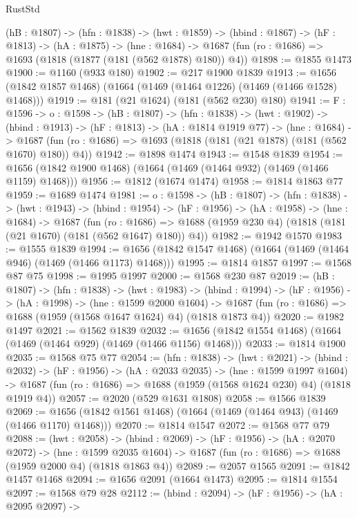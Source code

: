 \begin{lexlean}{RustStd}
\begin{coremodule}
{\begin{coremodule}
{{{  (hB : @1807) ->
  (hfn : @1838) ->
  (hwt : @1859) ->
  (hbind : @1867) ->
  (hF : @1813) ->
  (hA : @1875) ->
  (hne : @1684) -> @1687 (fun (ro : @1686) => @1693 (@1818 (@1877 (@181 (@562 @1878) @180)) @4))
@1898 := @1855 @1473
@1900 := @1160 (@933 @180)
@1902 := @217 @1900 @1839
@1913 := @1656 (@1842 @1857 @1468) (@1664 (@1469 (@1464 @1226) (@1469 (@1466 @1528) @1468)))
@1919 := @181 (@21 @1624) (@181 (@562 @230) @180)
@1941 := {F : @1596} ->
  {o : @1598} ->
  (hB : @1807) ->
  (hfn : @1838) ->
  (hwt : @1902) ->
  (hbind : @1913) ->
  (hF : @1813) ->
  (hA : @1814 @1919 @77) ->
  (hne : @1684) ->
  @1687 (fun (ro : @1686) => @1693 (@1818 (@181 (@21 @1878) (@181 (@562 @1670) @180)) @4))
@1942 := @1898 @1474
@1943 := @1548 @1839
@1954 := @1656 (@1842 @1900 @1468) (@1664 (@1469 (@1464 @932) (@1469 (@1466 @1159) @1468)))
@1956 := @1812 (@1674 @1474)
@1958 := @1814 @1863 @77
@1959 := @1689 @1474
@1981 := {o : @1598} ->
  (hB : @1807) ->
  (hfn : @1838) ->
  (hwt : @1943) ->
  (hbind : @1954) ->
  (hF : @1956) ->
  (hA : @1958) ->
  (hne : @1684) ->
  @1687
    (fun (ro : @1686) =>
    @1688 (@1959 @230 @4) (@1818 (@181 (@21 @1670) (@181 (@562 @1647) @180)) @4))
@1982 := @1942 @1570
@1983 := @1555 @1839
@1994 := @1656 (@1842 @1547 @1468) (@1664 (@1469 (@1464 @946) (@1469 (@1466 @1173) @1468)))
@1995 := @1814 @1857
@1997 := @1568 @87 @75
@1998 := @1995 @1997
@2000 := @1568 @230 @87
@2019 := (hB : @1807) ->
  (hfn : @1838) ->
  (hwt : @1983) ->
  (hbind : @1994) ->
  (hF : @1956) ->
  (hA : @1998) ->
  (hne : @1599 @2000 @1604) ->
  @1687 (fun (ro : @1686) => @1688 (@1959 (@1568 @1647 @1624) @4) (@1818 @1873 @4))
@2020 := @1982 @1497
@2021 := @1562 @1839
@2032 := @1656 (@1842 @1554 @1468) (@1664 (@1469 (@1464 @929) (@1469 (@1466 @1156) @1468)))
@2033 := @1814 @1900
@2035 := @1568 @75 @77
@2054 := (hfn : @1838) ->
  (hwt : @2021) ->
  (hbind : @2032) ->
  (hF : @1956) ->
  (hA : @2033 @2035) ->
  (hne : @1599 @1997 @1604) ->
  @1687 (fun (ro : @1686) => @1688 (@1959 (@1568 @1624 @230) @4) (@1818 @1919 @4))
@2057 := @2020 (@529 @1631 @1808)
@2058 := @1566 @1839
@2069 := @1656 (@1842 @1561 @1468) (@1664 (@1469 (@1464 @943) (@1469 (@1466 @1170) @1468)))
@2070 := @1814 @1547
@2072 := @1568 @77 @79
@2088 := (hwt : @2058) ->
  (hbind : @2069) ->
  (hF : @1956) ->
  (hA : @2070 @2072) ->
  (hne : @1599 @2035 @1604) -> @1687 (fun (ro : @1686) => @1688 (@1959 @2000 @4) (@1818 @1863 @4))
@2089 := @2057 @1565
@2091 := @1842 @1457 @1468
@2094 := @1656 @2091 (@1664 @1473)
@2095 := @1814 @1554
@2097 := @1568 @79 @28
@2112 := (hbind : @2094) ->
  (hF : @1956) ->
  (hA : @2095 @2097) ->
}}}
\end{coremodule}}
\end{coremodule}
\end{lexlean}
